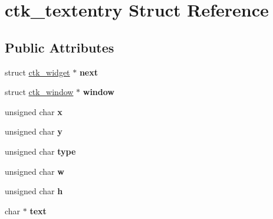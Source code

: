 \hypertarget{structctk__textentry}{}\section{ctk\+\_\+textentry Struct Reference}
\label{structctk__textentry}
\subsection*{Public Attributes}
\begin{DoxyCompactItemize}
\item 
\hypertarget{structctk__textentry_a83d08b3c85e4dd7d34f87d5ae53557cc}{}struct \hyperlink{structctk__widget}{ctk\+\_\+widget} $\ast$ {\bfseries next}\label{structctk__textentry_a83d08b3c85e4dd7d34f87d5ae53557cc}

\item 
\hypertarget{structctk__textentry_a312d2015ed964c878e9ce513f0b40c73}{}struct \hyperlink{structctk__window}{ctk\+\_\+window} $\ast$ {\bfseries window}\label{structctk__textentry_a312d2015ed964c878e9ce513f0b40c73}

\item 
\hypertarget{structctk__textentry_ab8ddb0c05f0e0b5d987edb4b52e262ee}{}unsigned char {\bfseries x}\label{structctk__textentry_ab8ddb0c05f0e0b5d987edb4b52e262ee}

\item 
\hypertarget{structctk__textentry_adff4aab7041b9a699e317d2c7be7051e}{}unsigned char {\bfseries y}\label{structctk__textentry_adff4aab7041b9a699e317d2c7be7051e}

\item 
\hypertarget{structctk__textentry_acc1af6b2633cde0000db681c66fe2c3a}{}unsigned char {\bfseries type}\label{structctk__textentry_acc1af6b2633cde0000db681c66fe2c3a}

\item 
\hypertarget{structctk__textentry_a805ae0df29a0f282b6b380f5445bb4d2}{}unsigned char {\bfseries w}\label{structctk__textentry_a805ae0df29a0f282b6b380f5445bb4d2}

\item 
\hypertarget{structctk__textentry_aae32deb4f42641908bedfbfc5063ab18}{}unsigned char {\bfseries h}\label{structctk__textentry_aae32deb4f42641908bedfbfc5063ab18}

\item 
\hypertarget{structctk__textentry_a231dc737ea0350ce8494aa510b854e7d}{}char $\ast$ {\bfseries text}\label{structctk__textentry_a231dc737ea0350ce8494aa510b854e7d}


\end{DoxyCompactItemize}
